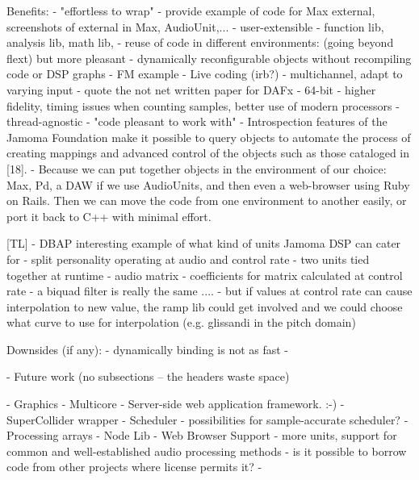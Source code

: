 \documentclass[twoside,10pt]{article}
\begin{document}
    Benefits:
        - "effortless to wrap" -  provide example of code for Max external, screenshots of external in Max, AudioUnit,...
        - user-extensible - function lib, analysis lib, math lib, 
        - reuse of code in different environments: (going beyond flext) but more pleasant
        - dynamically reconfigurable objects without recompiling code or DSP graphs
            - FM example
            - Live coding (irb?)
        - multichannel, adapt to varying input  - quote the not net written paper for DAFx
        - 64-bit - higher fidelity, timing issues when counting samples, better use of modern processors
        - thread-agnostic
        - "code pleasant to work with"
        - Introspection features of the Jamoma Foundation make it possible to query objects to automate the process of creating mappings and advanced control of the objects such as those cataloged in [18].
        - Because we can put together objects in the environment of our choice: Max, Pd, a DAW if we use AudioUnits, and then even a web-browser using Ruby on Rails. Then we can move the code from one environment to another easily, or port it back to C++ with minimal effort.




[TL]    - DBAP interesting example of what kind of units Jamoma DSP can cater for
        - split personality operating at audio and control rate
            - two units tied together at runtime
                - audio matrix
                - coefficients for matrix calculated at control rate
        - a biquad filter is really the same ....
            - but if values at control rate can cause interpolation to new value, the ramp lib could get involved and we could choose what curve to use for interpolation (e.g. glissandi in the pitch domain)


    Downsides (if any):
        -  dynamically binding is not as fast
        - 
    
- Future work (no subsections -- the headers waste space)

    - Graphics
    - Multicore
    - Server-side web application framework. :-)
    - SuperCollider wrapper
    - Scheduler - possibilities for sample-accurate scheduler?
    - Processing arrays
    - Node Lib
    - Web Browser Support
    - more units, support for common and well-established audio processing methods -  is it possible to borrow code from other projects where license permits it?
    - 
    
\end{document}
